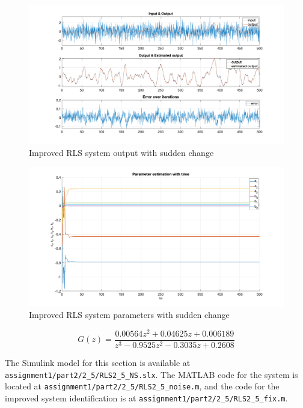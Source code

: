 \begin{figure}
	\centering
	\includegraphics[totalheight=8cm]{images/RLSISPCFixedOutput.png}
	\caption{Improved RLS system output with sudden change}
	\label{fig:RLSISPCFixedOutput}
\end{figure}
\begin{figure}
	\centering
	\includegraphics[totalheight=8cm]{images/RLSISPCFixedParams.png}
	\caption{Improved RLS system parameters with sudden change}
	\label{fig:RLSISPCFixedOutputParams}
\end{figure}
\begin{equation}
	G(z) =	\frac{0.00564 z^2 + 0.04625 z + 0.006189}{z^3 - 0.9525 z^2 - 0.3035 z + 0.2608}
	\label{eq:RLSISPCFixedTransferFunction}
\end{equation}

The Simulink model for this section is available at \lstinline|assignment1/part2/2_5/RLS2_5_NS.slx|. The MATLAB code for the system is located at \lstinline|assignment1/part2/2_5/RLS2_5_noise.m|, and the code for the improved system identification is at \lstinline|assignment1/part2/2_5/RLS2_5_fix.m|.
